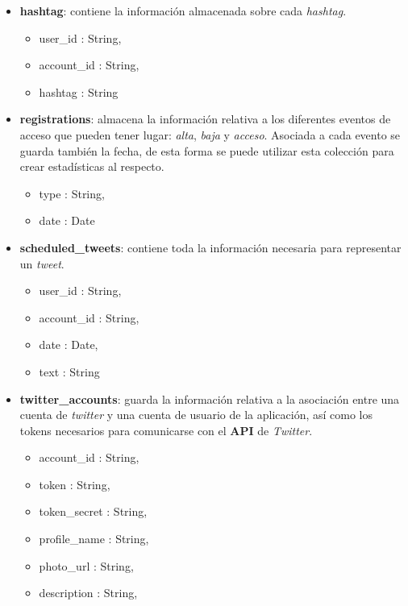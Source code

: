 \documentclass[a4paper]{article}
\begin{document}
	\begin{itemize}
	\item \textbf{hashtag}: contiene la información almacenada sobre cada \textit{hashtag}.
		
		\begin{itemize}
		\item user\_id : String,
		\item account\_id : String,
		\item hashtag : String
		\end{itemize}
		
	\item \textbf{registrations}: almacena la información relativa a los diferentes eventos de acceso que pueden tener lugar: \textit{alta}, \textit{baja} y \textit{acceso}. Asociada a cada evento se guarda también la fecha, de esta forma se puede utilizar esta colección para crear estadísticas al respecto.
		
		\begin{itemize}
		\item type : String,
		\item date : Date
		\end{itemize}
	 
	\item \textbf{scheduled\_tweets}: contiene toda la información necesaria para representar un \textit{tweet}.
	
		\begin{itemize}
		\item user\_id : String,
		\item account\_id : String,
		\item date : Date,
		\item text : String
		\end{itemize}
	
	\item \textbf{twitter\_accounts}: guarda la información relativa a la asociación entre una cuenta de \textit{twitter} y una cuenta de usuario de la aplicación, así como los tokens necesarios para comunicarse con el \textbf{API} de \textit{Twitter}.
	
		\begin{itemize}
		\item account\_id : String,
		\item token : String,
		\item token\_secret : String,
		\item profile\_name : String,
		\item photo\_url : String,
		\item description : String,
		\end{itemize}
	

\end{itemize}
\end{document}
